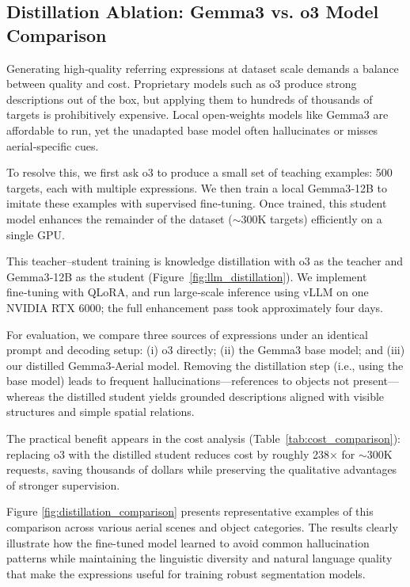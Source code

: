 \subsection{Distillation Ablation: Gemma3 vs. o3 Model Comparison}
\label{subsec:distillation_ablation}

Generating high‑quality referring expressions at dataset scale demands a balance between quality and cost. Proprietary models such as o3 produce strong descriptions out of the box, but applying them to hundreds of thousands of targets is prohibitively expensive. Local open‑weights models like Gemma3 are affordable to run, yet the unadapted base model often hallucinates or misses aerial‑specific cues.

To resolve this, we first ask o3 to produce a small set of teaching examples: 500 targets, each with multiple expressions. We then train a local Gemma3‑12B to imitate these examples with supervised fine‑tuning. Once trained, this student model enhances the remainder of the dataset (\(\sim\)300K targets) efficiently on a single GPU.

This teacher–student training is knowledge distillation with o3 as the teacher and Gemma3‑12B as the student (Figure~\ref{fig:llm_distillation}). We implement fine‑tuning with QLoRA\cite{qlora}, and run large‑scale inference using vLLM\cite{vllm} on one NVIDIA RTX 6000; the full enhancement pass took approximately four days.

For evaluation, we compare three sources of expressions under an identical prompt and decoding setup: (i) o3 directly; (ii) the Gemma3 base model; and (iii) our distilled Gemma3‑Aerial model. Removing the distillation step (i.e., using the base model) leads to frequent hallucinations—references to objects not present—whereas the distilled student yields grounded descriptions aligned with visible structures and simple spatial relations.

The practical benefit appears in the cost analysis (Table~\ref{tab:cost_comparison}): replacing o3 with the distilled student reduces cost by roughly 238× for \(\sim\)300K requests, saving thousands of dollars while preserving the qualitative advantages of stronger supervision.

Figure \ref{fig:distillation_comparison} presents representative examples of this comparison across various aerial scenes and object categories. The results clearly illustrate how the fine-tuned model learned to avoid common hallucination patterns while maintaining the linguistic diversity and natural language quality that make the expressions useful for training robust segmentation models.

